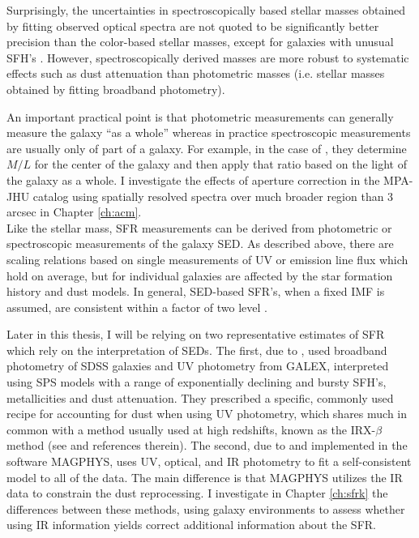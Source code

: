 Surprisingly, the uncertainties in spectroscopically based stellar
masses obtained by fitting observed optical spectra
\citep{kauffmann_stellar_2003, 2012MNRAS.421..314C} are not quoted to
be significantly better precision than the color-based stellar masses,
except for galaxies with unusual SFH's
\citet{2005MNRAS.362...41G}. However, spectroscopically derived masses
are more robust to systematic effects such as dust attenuation than
photometric masses (i.e. stellar masses obtained by fitting broadband
photometry).

An important practical point is that photometric measurements can
generally measure the galaxy ``as a whole'' whereas in practice
spectroscopic measurements are usually only of part of a galaxy. For
example, in the case of \citet{kauffmann_stellar_2003}, they determine
$M/L$ for the center of the galaxy and then apply that ratio based on
the light of the galaxy as a whole.  I investigate the effects of
aperture correction in the MPA-JHU catalog using spatially resolved
spectra over much broader region than 3 arcsec in Chapter
\ref{ch:acm}.\\

Like the stellar mass, SFR measurements can be derived from
photometric or spectroscopic measurements of the galaxy SED. As
described above, there are scaling relations based on single
measurements of UV or emission line flux which hold on average, but
for individual galaxies are affected by the star formation history and
dust models.  In general, SED-based SFR's, when a fixed IMF is
assumed, are consistent within a factor of two level
\citep{conroy_modeling_2013}.

Later in this thesis, I will be relying on two representative
estimates of SFR which rely on the interpretation of SEDs.  The first,
due to \citet{salim_uv_2007}, used broadband photometry of SDSS
galaxies and UV photometry from GALEX, interpreted using SPS models
with a range of exponentially declining and bursty SFH's,
metallicities and dust attenuation. They prescribed a specific,
commonly used recipe for accounting for dust when using UV photometry,
which shares much in common with a method usually used at high
redshifts, known as the IRX-$\beta$ method (see \citealt{overzier11a}
and references therein). The second, due to
\citet{da_cunha_simple_2008} and implemented in the software MAGPHYS,
uses UV, optical, and IR photometry to fit a self-consistent model to
all of the data. The main difference is that MAGPHYS utilizes the IR
data to constrain the dust reprocessing. I investigate in Chapter
\ref{ch:sfrk} the differences between these methods, using galaxy
environments to assess whether using IR information yields correct
additional information about the SFR.

